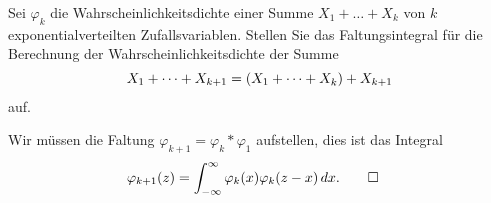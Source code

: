 Sei $\varphi_k$ die Wahrscheinlichkeitsdichte einer Summe
$X_1+\dots+X_k$ von $k$ exponentialverteilten Zufallsvariablen.
Stellen Sie das Faltungsintegral für die Berechnung der
Wahrscheinlichkeitsdichte der Summe
\[
X_1+\dots+X_{k+1}
=
(X_1+\dots+X_{k\mathstrut}) + X_{k+1}
\]
auf.

\begin{loesung}
Wir müssen die Faltung $\varphi_{k+1}=\varphi_k * \varphi_1$ aufstellen,
dies ist das Integral
\begin{align*}
\varphi_{k+1}(z)
&=
\int_{-\infty}^\infty
\varphi_k(x) \varphi_{k}(z-x)\,dx.
\qedhere
\end{align*}
\end{loesung}

